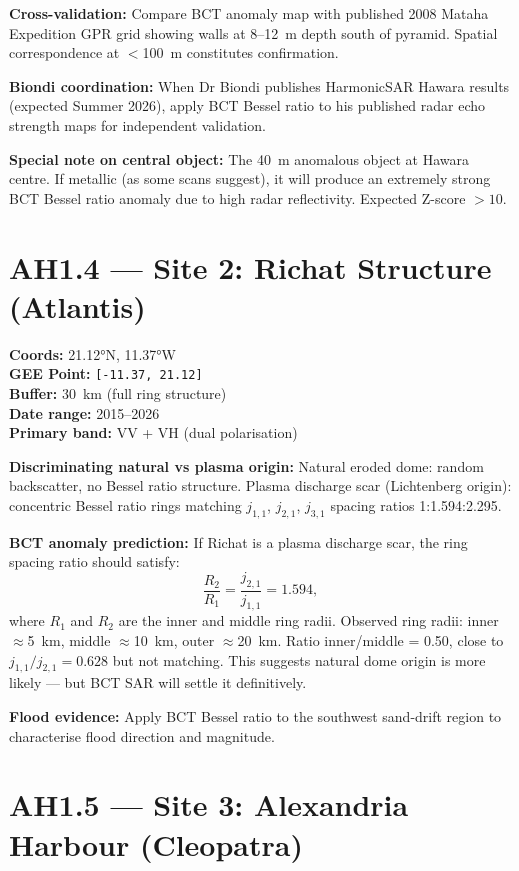 \documentclass[12pt,twocolumn]{article}
\begin{document}
\textbf{Cross-validation:} Compare BCT anomaly map with
published 2008 Mataha Expedition GPR grid showing walls
at 8--12~m depth south of pyramid. Spatial correspondence
at $<$100~m constitutes confirmation.

\textbf{Biondi coordination:} When Dr Biondi publishes
HarmonicSAR Hawara results (expected Summer 2026), apply
BCT Bessel ratio to his published radar echo strength maps
for independent validation.

\textbf{Special note on central object:} The 40~m anomalous
object at Hawara centre. If metallic (as some scans suggest),
it will produce an extremely strong BCT Bessel ratio anomaly
due to high radar reflectivity. Expected Z-score $>10$.

\section{AH1.4 --- Site 2: Richat Structure (Atlantis)}

\textbf{Coords:} 21.12°N, 11.37°W\\
\textbf{GEE Point:} \verb|[-11.37, 21.12]|\\
\textbf{Buffer:} 30~km (full ring structure)\\
\textbf{Date range:} 2015--2026\\
\textbf{Primary band:} VV + VH (dual polarisation)

\textbf{Discriminating natural vs plasma origin:}
Natural eroded dome: random backscatter, no Bessel ratio
structure. Plasma discharge scar (Lichtenberg origin):
concentric Bessel ratio rings matching $j_{1,1}$, $j_{2,1}$,
$j_{3,1}$ spacing ratios 1:1.594:2.295.

\textbf{BCT anomaly prediction:} If Richat is a plasma
discharge scar, the ring spacing ratio should satisfy:
\begin{equation}
\frac{R_2}{R_1} = \frac{j_{2,1}}{j_{1,1}} = 1.594,
\end{equation}
where $R_1$ and $R_2$ are the inner and middle ring radii.
Observed ring radii: inner $\approx$5~km, middle $\approx$10~km,
outer $\approx$20~km. Ratio inner/middle = 0.50, close to
$j_{1,1}/j_{2,1} = 0.628$ but not matching. This suggests
natural dome origin is more likely --- but BCT SAR will
settle it definitively.

\textbf{Flood evidence:} Apply BCT Bessel ratio to the
southwest sand-drift region to characterise flood direction
and magnitude.

\section{AH1.5 --- Site 3: Alexandria Harbour (Cleopatra)}
\end{document}
